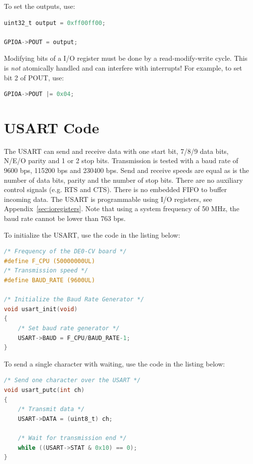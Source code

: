 \documentclass[12pt]{article}
\begin{document}
To set the outputs, use:

\begin{lstlisting}[language=C]
uint32_t output = 0xff00ff00;

GPIOA->POUT = output;
\end{lstlisting}

Modifying bits of a I/O register must be done by a read-modify-write cycle. This is \emph{not} atomically handled and can interfere with interrupts! For example, to set bit 2 of POUT, use:

\begin{lstlisting}[language=C]
GPIOA->POUT |= 0x04;
\end{lstlisting}

\section{USART Code}

The USART can send and receive data with one start bit, 7/8/9 data bits, N/E/O parity and 1 or 2 stop bits. Transmission is tested with a baud rate of 9600 bps, 115200 bps and 230400 bps. Send and receive speeds are equal as is the number of data bits, parity and the number of stop bits. There are no auxiliary control signals (e.g. RTS and CTS). There is no embedded FIFO to buffer incoming data. The USART is programmable using I/O registers, see Appendix~\ref{sec:ioregisters}. Note that using a system frequency of 50 MHz, the baud rate cannot be lower than 763 bps.

To initialize the USART, use the code in the listing below:

\begin{lstlisting}[language=C]
/* Frequency of the DE0-CV board */
#define F_CPU (50000000UL)
/* Transmission speed */
#define BAUD_RATE (9600UL)

/* Initialize the Baud Rate Generator */
void usart_init(void)
{
    /* Set baud rate generator */
    USART->BAUD = F_CPU/BAUD_RATE-1;
}
\end{lstlisting}

To send a single character with waiting, use the code in the listing below:

\begin{lstlisting}[language=C]
/* Send one character over the USART */
void usart_putc(int ch)
{
    /* Transmit data */
    USART->DATA = (uint8_t) ch;
            
    /* Wait for transmission end */
    while ((USART->STAT & 0x10) == 0);
}
\end{lstlisting}
\end{document}
